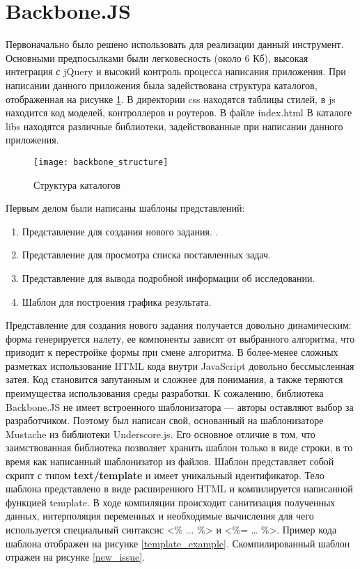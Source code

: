 \section{Backbone.JS}
Первоначально было решено использовать для реализации данный инструмент. Основными предпосылками были легковесность (около 6 Кб), высокая интеграция с jQuery и высокий контроль процесса написания приложения. При написании данного приложения была задействована структура каталогов, отображенная на рисунке \ref{backbone_structure}. В директории css находятся таблицы стилей, в js находится код моделей, контроллеров и роутеров. В файле index.html  В каталоге libs находятся различные библиотеки, задействованные при написании данного приложения.

\begin{figure}[h]
\center\texttt{[image: backbone\_structure]}
\caption{Структура каталогов}\label{backbone_structure}
\end{figure}

Первым делом были написаны шаблоны представлений:

\begin{enumerate}
 \item Представление для создания нового задания. .
 \item Представление для просмотра списка поставленных задач.
 \item Представление для вывода подробной информации об исследовании.
 \item Шаблон для построения графика результата.
\end{enumerate}

Представление для создания нового задания получается довольно динамическим: форма генерируется налету, ее компоненты зависят от выбранного алгоритма, что приводит к перестройке формы при смене алгоритма. В более-менее сложных разметках использование HTML кода внутри JavaScript довольно бессмысленная затея. Код становится запутанным и сложнее для понимания, а также теряются преимущества использования среды разработки. К сожалению, библиотека Backbone.JS не имеет встроенного шаблонизатора --- авторы оставляют выбор за разработчиком. Поэтому был написан свой, основанный на шаблонизаторе Mustache из библиотеки Underscore.js. Его основное отличие в том, что заимствованная библиотека позволяет хранить шаблон только в виде строки, в то время как написанный шаблонизатор из файлов. Шаблон представляет собой скрипт с типом \textbf{text/template} и имеет уникальный идентификатор. Тело шаблона представлено в виде расширенного HTML и компилируется написанной функцией template. В ходе компиляции происходит санитизация полученных данных, интерполяция переменных и необходимые вычисления для чего используется специальный синтаксис <\% ... \%> и <\%= … \%>. Пример кода шаблона отображен на рисунке \ref{template_example}. Скомпилированный шаблон отражен на рисунке \ref{new_issue}.

